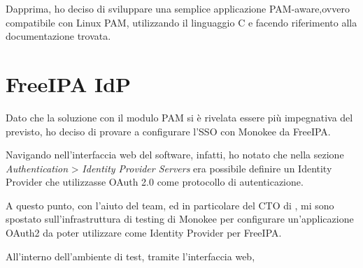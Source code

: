 Dapprima, ho deciso di sviluppare una semplice applicazione PAM-aware,ovvero compatibile con Linux PAM, utilizzando il linguaggio C e facendo riferimento alla documentazione trovata.   


\section{FreeIPA IdP}

Dato che la soluzione con il modulo PAM si è rivelata essere più impegnativa del previsto, ho deciso di provare a configurare l'SSO con Monokee da FreeIPA. 

Navigando nell'interfaccia web del software, infatti, ho notato che nella sezione \textit{Authentication} > \textit{Identity Provider Servers} era possibile definire un Identity Provider che utilizzasse OAuth 2.0 come protocollo di autenticazione.

A questo punto, con l'aiuto del team, ed in particolare del CTO di \myAzienda, mi sono spostato sull'infrastruttura di testing di Monokee per configurare un'applicazione OAuth2 da poter utilizzare come Identity Provider per FreeIPA.

All'interno dell'ambiente di test, tramite l'interfaccia web, 